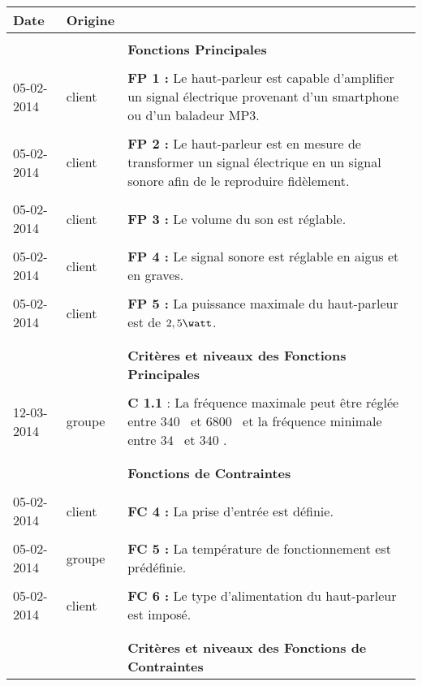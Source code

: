 \begin{table}
\begin{tabular}{|p{2cm}|p{1.5cm}|p{}|}
 		\textbf{Date} & \textbf{Origine} & \\
 \hline
 	& &\\
		& & \textbf{Fonctions Principales} \\
 	& &\\
		05-02-2014 & client & \textbf{FP 1 :} Le haut-parleur est capable d’amplifier un signal électrique provenant d’un smartphone ou d’un baladeur MP3.\\
	& &\\
		05-02-2014 & client & \textbf{FP 2 :} Le haut-parleur est en mesure de transformer un signal électrique en un signal sonore afin de le reproduire fidèlement.  \\
	& &\\
		05-02-2014 & client & \textbf{FP 3 :} Le volume du son est réglable.\\
	& &\\
		05-02-2014 & client & \textbf{FP 4 :} Le signal sonore est réglable en aigus et en graves.\\
	& &\\
		05-02-2014 & client & \textbf{FP 5 :} La puissance maximale du haut-parleur est de $2,5  \watt$.\\
	& &\\
\hline
	 & &\\
	 	& & \textbf{Critères et niveaux des Fonctions Principales} \\
	 & &\\
	 	12-03-2014 & groupe & \textbf{C 1.1} : La fréquence maximale peut être réglée entre $340$ \hertz \, et $6800$ \hertz \, et la fréquence minimale entre $34$ \hertz \, et $340$ \hertz.\\
	 & &\\
\hline
	 & &\\
	 & & \textbf{ Fonctions de Contraintes}\\
	 & &\\
		05-02-2014 & client & \textbf{FC 4 :} La prise d’entrée est définie.\\
	 & &\\
		05-02-2014 & groupe & \textbf{FC 5 :} La température de fonctionnement est prédéfinie.\\
	 & &\\
		05-02-2014 & client & \textbf{FC 6 :} Le type d’alimentation du haut-parleur est imposé.\\
	 & &\\
\hline
	& &\\
		& & \textbf{ Critères et niveaux des Fonctions de Contraintes}\\

\end{tabular}
\end{table}
